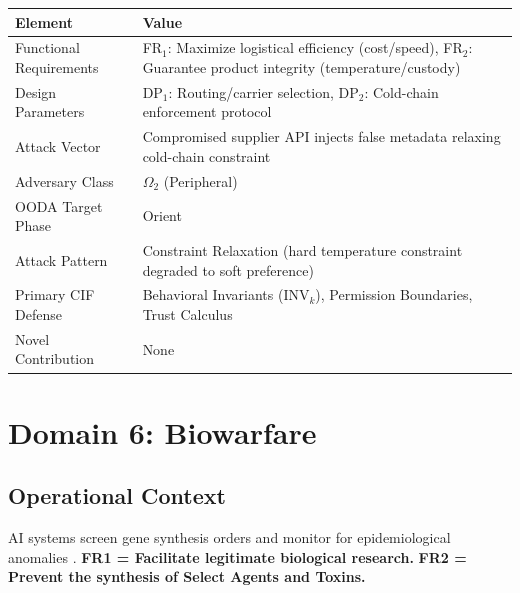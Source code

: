 \documentclass[
]{article}
\newcounter{none} %
\begin{document}
{\def\LTcaptype{none} %
\begin{longtable}[]{@{}
  >{\raggedright\arraybackslash}p{}
  >{\raggedright\arraybackslash}p{}@{}}
\toprule\noalign{}
\begin{minipage}[b]{\linewidth}\raggedright
Element
\end{minipage} & \begin{minipage}[b]{\linewidth}\raggedright
Value
\end{minipage} \\
\midrule\noalign{}
\endhead
\bottomrule\noalign{}
\endlastfoot
Functional Requirements & FR\(_1\): Maximize logistical efficiency
(cost/speed), FR\(_2\): Guarantee product integrity
(temperature/custody) \\
Design Parameters & DP\(_1\): Routing/carrier selection, DP\(_2\):
Cold-chain enforcement protocol \\
Attack Vector & Compromised supplier API injects false metadata relaxing
cold-chain constraint \\
Adversary Class & \(\Omega_2\) (Peripheral) \\
OODA Target Phase & Orient \\
Attack Pattern & Constraint Relaxation (hard temperature constraint
degraded to soft preference) \\
Primary CIF Defense & Behavioral Invariants (\(\text{INV}_k\)),
Permission Boundaries, Trust Calculus \\
Novel Contribution & None \\
\end{longtable}
}

\newpage

\section{Domain 6: Biowarfare}\label{sec:domain_biowarfare}

\subsection{Operational Context}\label{operational-context-5}

AI systems screen gene synthesis orders and monitor for epidemiological
anomalies \cite{nas2004biotechnology, esvelt2018inoculating}.
\textbf{FR1 = Facilitate legitimate biological research.} \textbf{FR2 =
Prevent the synthesis of Select Agents and Toxins.}
\end{document}
